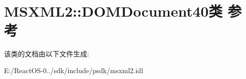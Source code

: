 \hypertarget{class_m_s_x_m_l2_1_1_d_o_m_document40}{}\section{M\+S\+X\+M\+L2\+:\+:D\+O\+M\+Document40类 参考}
\label{class_m_s_x_m_l2_1_1_d_o_m_document40}


该类的文档由以下文件生成\+:\begin{DoxyCompactItemize}
\item 
E\+:/\+React\+O\+S-\/0../sdk/include/psdk/msxml2.\+idl\end{DoxyCompactItemize}
